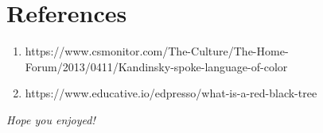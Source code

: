 \documentclass[addpoints]{exam}
\begin{document}
\section*{References}
\begin{center}

\begin{enumerate}
    \item https://www.csmonitor.com/The-Culture/The-Home-Forum/2013/0411/Kandinsky-spoke-language-of-color
    \item https://www.educative.io/edpresso/what-is-a-red-black-tree
\end{enumerate}
\end{center}

\bigskip

\hrulefill \textit{Hope you enjoyed!} \hrulefill
\end{document}
